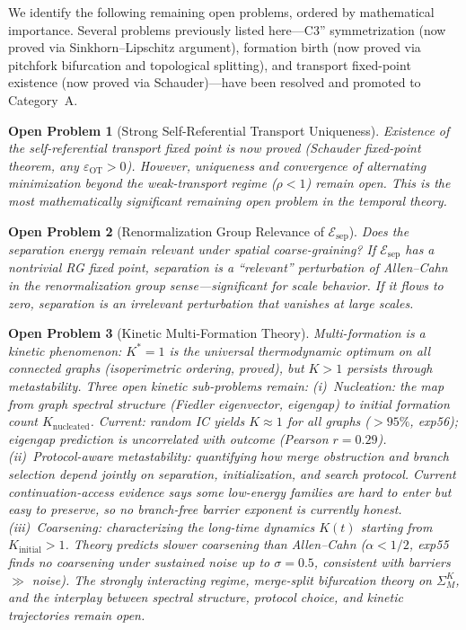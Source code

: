 \documentclass[lettersize,journal]{IEEEtran}
\newtheorem{openproblem}{Open Problem}
\begin{document}
We identify the following remaining open problems, ordered by mathematical importance. Several problems previously listed here---C3'' symmetrization (now proved via Sinkhorn--Lipschitz argument), formation birth (now proved via pitchfork bifurcation and topological splitting), and transport fixed-point existence (now proved via Schauder)---have been resolved and promoted to Category~A.

\begin{openproblem}[Strong Self-Referential Transport Uniqueness]
Existence of the self-referential transport fixed point is now proved (Schauder fixed-point theorem, any $\varepsilon_{\mathrm{OT}} > 0$). However, uniqueness and convergence of alternating minimization beyond the weak-transport regime ($\rho < 1$) remain open. This is the most mathematically significant remaining open problem in the temporal theory.
\end{openproblem}

\begin{openproblem}[Renormalization Group Relevance of $\mathcal{E}_{\mathrm{sep}}$]
Does the separation energy remain relevant under spatial coarse-graining? If $\mathcal{E}_{\mathrm{sep}}$ has a nontrivial RG fixed point, separation is a ``relevant'' perturbation of Allen--Cahn in the renormalization group sense---significant for scale behavior. If it flows to zero, separation is an irrelevant perturbation that vanishes at large scales.
\end{openproblem}

\begin{openproblem}[Kinetic Multi-Formation Theory]
Multi-formation is a kinetic phenomenon: $K^* = 1$ is the universal thermodynamic optimum on all connected graphs (isoperimetric ordering, proved), but $K > 1$ persists through metastability. Three open kinetic sub-problems remain: (i)~\emph{Nucleation:} the map from graph spectral structure (Fiedler eigenvector, eigengap) to initial formation count $K_{\mathrm{nucleated}}$. Current: random IC yields $K \approx 1$ for all graphs ($>95\%$, exp56); eigengap prediction is uncorrelated with outcome (Pearson $r = 0.29$). (ii)~\emph{Protocol-aware metastability:} quantifying how merge obstruction and branch selection depend jointly on separation, initialization, and search protocol. Current continuation-access evidence says some low-energy families are hard to enter but easy to preserve, so no branch-free barrier exponent is currently honest. (iii)~\emph{Coarsening:} characterizing the long-time dynamics $K(t)$ starting from $K_{\mathrm{initial}} > 1$. Theory predicts slower coarsening than Allen--Cahn ($\alpha < 1/2$, exp55 finds no coarsening under sustained noise up to $\sigma = 0.5$, consistent with barriers $\gg$ noise). The strongly interacting regime, merge-split bifurcation theory on $\Sigma^K_M$, and the interplay between spectral structure, protocol choice, and kinetic trajectories remain open.
\end{openproblem}
\end{document}
